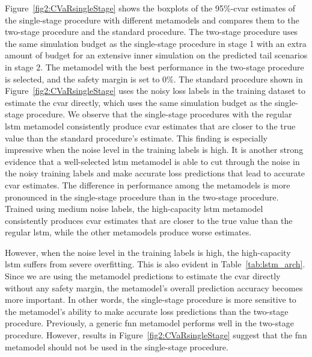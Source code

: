 Figure~\ref{fig2:CVaRsingleStage} shows the boxplots of the 95\%-\gls{cvar} estimates of the single-stage procedure with different metamodels and compares them to the two-stage procedure and the standard procedure.
The two-stage procedure uses the same simulation budget as the single-stage procedure in stage 1 with an extra amount of budget for an  extensive inner simulation on the predicted tail scenarios in stage 2.
The metamodel with the best performance in the two-stage procedure is selected, and the safety margin is set to $0\%$.
The standard procedure shown in Figure~\ref{fig2:CVaRsingleStage} uses the noisy loss labels in the training dataset to estimate the \gls{cvar} directly, which uses the same simulation budget as the single-stage procedure.
We observe that the single-stage procedures with the regular \gls{lstm} metamodel consistently produce \gls{cvar} estimates that are closer to the true value than the standard procedure's estimate.
This finding is especially impressive when the noise level in the training labels is high.
It is another strong evidence that a well-selected \gls{lstm} metamodel is able to cut through the noise in the noisy training labels and make accurate loss predictions that lead to accurate \gls{cvar} estimates.
The difference in performance among the metamodels is more pronounced in the single-stage procedure than in the two-stage procedure.
Trained using medium noise labels, the high-capacity \gls{lstm} metamodel consistently produces \gls{cvar} estimates that are closer to the true value than the regular \gls{lstm}, while the other metamodels produce worse estimates.

However, when the noise level in the training labels is high, the high-capacity \gls{lstm} suffers from severe overfitting. 
This is also evident in Table~\ref{tab:lstm_arch}.
Since we are using the metamodel predictions to estimate the \gls{cvar} directly without any safety margin, the metamodel's overall prediction accuracy becomes more important.
In other words, the single-stage procedure is more sensitive to the metamodel's ability to make accurate loss predictions than the two-stage procedure.
Previously, a generic \gls{fnn} metamodel performs well in the two-stage procedure. 
However, results in Figure~\ref{fig2:CVaRsingleStage} suggest that the \gls{fnn} metamodel should not be used in the single-stage procedure.


